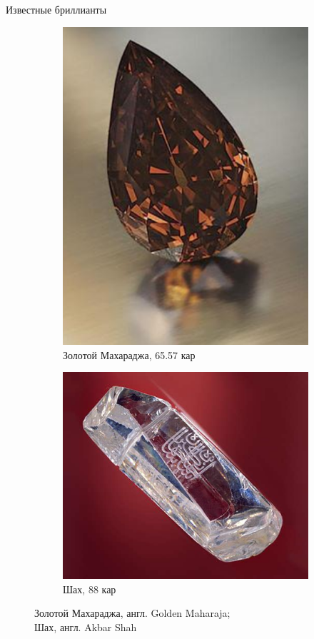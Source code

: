 \documentclass[_Banking_p3.tex]{subfiles}
\begin{document}
\begin{frame}{Известные бриллианты}
\begin{figure}	
	\centering
	\begin{subfigure}[t]{4.3cm}
		\centering
		\includegraphics[scale=0.28]{img/Golden_Maharaja.png}
	\caption{Золотой Махараджа, 65.57 кар}\label{fig:Golden_Maharaja}	
	\end{subfigure}
	\quad
	\begin{subfigure}[t]{4.3cm}
		\centering
		\includegraphics[scale=0.45]{img/shah.png}
		\caption{Шах, 88 кар}\label{fig:shah}
	\end{subfigure}
	\caption{Золотой Махараджа, англ. Golden Maharaja;\\ Шах, англ. Akbar Shah}\label{fig:diamonds2}
\end{figure}
\end{frame}
\end{document}
